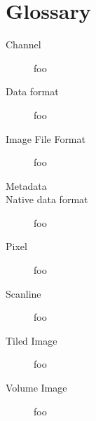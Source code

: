 \chapter{Glossary}

\begin{description}

\item[Channel] foo

\item[Data format] foo

\item[Image File Format] foo

\item[Metadata]

\item[Native data format] foo

\item[Pixel] foo

\item[Scanline] foo

\item[Tiled Image] foo

\item[Volume Image] foo

\end{description}

\chapwidthend
